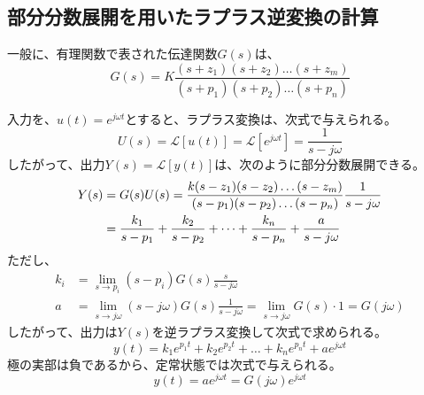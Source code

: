 \documentclass[book]{jlreq}
\begin{document}
\subsection{部分分数展開を用いたラプラス逆変換の計算}
一般に、有理関数で表された伝達関数$G(s)$は、
%
\begin{equation}
    G(s)=K\frac{(s+z_1)(s+z_2)\dots(s+z_m)}{(s+p_1)(s+p_2)\dots(s+p_n)}
\end{equation}
%

入力を、$u(t)=e^{j\omega t}$とすると、ラプラス変換は、次式で与えられる。
%
\begin{equation}
    U(s)= \mathcal{L}[u(t)]=\mathcal{L}[e^{j\omega t}]=\frac{1}{s-j\omega}
\end{equation}
%
したがって、出力$Y(s)=\mathcal{L}[y(t)]$は、次のように部分分数展開できる。
%
\begin{equation}
    \begin{split}
        Y(s) &= G(s)U(s) = \frac{k(s-z_1)(s-z_2)\dots(s-z_m)}{(s-p_1)(s-p_2)\dots(s-p_n)}\frac{1}{s-j\omega} \\
        &= \frac{k_1}{s-p_1}+\frac{k_2}{s-p_2}+\dots+\frac{k_n}{s-p_n}+\frac{a}{s-j\omega}\notag
    \end{split}
\end{equation}
%
ただし、
%
\begin{equation}
    \begin{split}
        k_i &= \lim_{s \to p_i}(s-p_i)G(s)\frac{s}{s-j\omega} \\
        a &=\lim_{s \to j\omega}(s-j\omega)G(s)\frac{1}{s-j\omega} =\lim_{s \to j\omega}G(s)\cdot 1=G(j\omega)
    \end{split}
\end{equation}
%
したがって、出力は$Y(s)$を逆ラプラス変換して次式で求められる。
%
\begin{equation}
    y(t)=k_1 e^{p_1 t}+k_2 e^{p_2 t}+ \dots + k_n e^{p_n t} + a e^{j\omega t}
\end{equation}
%
極の実部は負であるから、定常状態では次式で与えられる。
%
\begin{equation}
    y(t) = a e^{j\omega t} = G(j\omega) e^{j\omega t}
\end{equation}
%
\end{document}
